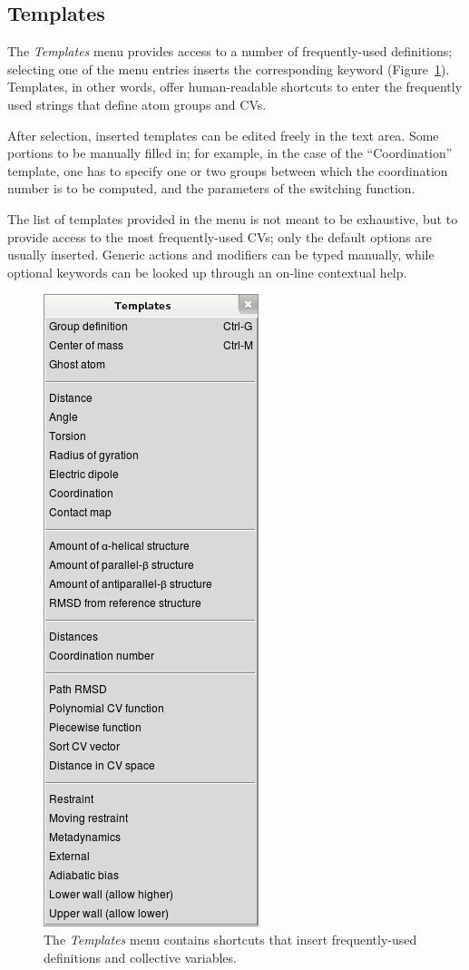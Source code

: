 \documentclass[preprint,12pt]{elsarticle}
\begin{document}
\subsection{Templates}

The \emph{Templates} menu provides access to a number of frequently-used
definitions; selecting one of the menu entries inserts the
corresponding keyword (Figure~\ref{fig:templates}). Templates, in
other words, offer human-readable shortcuts to enter the frequently used
strings that define atom groups and CVs.

After selection, inserted templates can be edited freely in the text
area.  Some portions to be manually filled in; for example, in the
case of the ``Coordination'' template, one has to specify one or two
groups between which the coordination number is to be computed, and
the parameters of the switching function.

The list of templates provided in the menu is not meant to be
exhaustive, but to provide access to the most frequently-used CVs;
only the default options are usually inserted. Generic actions and
modifiers can be typed manually, while optional keywords can be looked
up through an on-line contextual help.

\begin{figure}
  \centering
  \includegraphics[scale=.5]{images/templates}
  \caption{The \emph{Templates} menu contains shortcuts that
    insert frequently-used definitions and collective variables.}
  \label{fig:templates}
\end{figure}
\end{document}
